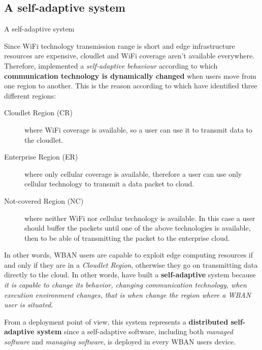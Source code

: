 \documentclass[10pt]{beamer}
\begin{document}
\subsection{A self-adaptive system}
\begin{frame}{A self-adaptive system} 

Since WiFi technology transmission range is short and edge infrastructure resources are expensive, cloudlet and WiFi coverage aren't available everywhere. Therefore, \citet{MSAReport} implemented a \textit{self-adaptive behaviour} according to which \textbf{communication technology is dynamically changed} when users move from one region to another. This is the reason according to which \citet{MSAReport} have identified three different regions:\cite[par.~3.1]{MSAReport} 

\begin{description}

\item[Cloudlet Region (CR)] where WiFi coverage is available, so a user can use it to transmit data to the cloudlet.

\item[Enterprise Region (ER)] where only cellular coverage is available, therefore  a user can use only cellular technology to transmit a data packet to cloud. 

\item[Not-covered Region (NC)] where neither WiFi nor cellular technology is available. In this case a user should buffer the packets until one of the above technologies is available, then to be able of transmitting the packet to the enterprise cloud. 

\end{description}

In other words, WBAN users are capable to exploit edge computing resources if and only if they are in a \textit{Cloudlet Region}, otherwise they go on transmitting data directly to the cloud. In other words, \citet{MSAReport} have built a \textbf{self-adaptive} system because \textit{it is capable to change its behavior, changing communication technology, when execution environment changes, that is when change the region where a WBAN user is situated}. 

From a deployment point of view, this system represents a \textbf{distributed self-adaptive system} since a self-adaptive software, including both \textit{managed software} and \textit{managing software}, is deployed in every WBAN users device.\cite{PatternsDecentralizedSelf}


\end{frame}
\end{document}
